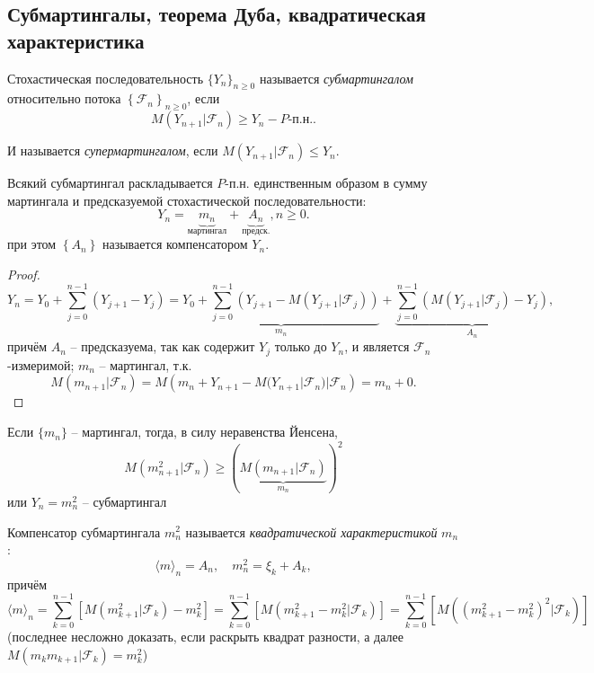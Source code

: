 \subsection{Субмартингалы, теорема Дуба, квадратическая характеристика}

\begin{definition}
  Стохастическая последовательность $\{Y_n\}_{n \geqslant 0}$ называется
  \emph{субмартингалом} относительно потока $ \left\{ \mathcal{F}_n \right\}_{n\geqslant 0} $,
  если
  \[
    M(Y_{n+1} | \mathcal{F}_n) \geqslant Y_n - \text{$P$-п.н.}.
  \]

  И называется \emph{супермартингалом}, если
  $M(Y_{n+1} | \mathcal{F}_n) \leqslant Y_n.$
\end{definition}


\begin{theorem}[Дуб]
  Всякий субмартингал раскладывается $P$-п.н. единственным образом в сумму мартингала
  и предсказуемой стохастической последовательности:
  \[
    Y_n = \underbrace{m_n}_{\text{мартингал}} + \underbrace{A_n}_{\text{предск.}}, n \geqslant 0.
  \]
  при этом $ \left\{ A_n \right\}  $ называется компенсатором $Y_n$.
\end{theorem}
\begin{proof}
  \[
    Y_n = Y_0 + \sum_{j=0}^{n-1} (Y_{j+1} - Y_j)
    = \underbrace{Y_0 + \sum_{j=0}^{n-1} (Y_{j+1} - M(Y_{j+1}|\mathcal{F}_j))}_{m_n}
    + \underbrace{\sum_{j=0}^{n-1} (M(Y_{j+1} | \mathcal{F}_j) - Y_j)}_{A_n},
  \]
  причём $A_n$ -- предсказуема, так как содержит $Y_j$ только до $Y_n$, и является
  $\mathcal{F}_n$-измеримой;
  $m_n$ -- мартингал, т.к.
  \[
    M( m_{n+1} | \mathcal{F}_n ) =
    M\left( m_n + Y_{n+1} - M(Y_{n+1} |\mathcal{F}_n) | \mathcal{F}_n \right) = m_n + 0.
  \]
\end{proof}

\begin{corollary}
  Если $\{m_n\}$ -- мартингал, тогда, в силу неравенства Йенсена,
  \[
    M(m_{n+1}^2 | \mathcal{F}_n) \geqslant \left( \underbrace{M(m_{n+1}|\mathcal{F}_n)}_{m_n} \right)^2
  \]
  или $Y_n = m_n^2$ -- субмартингал
\end{corollary}

\begin{definition}
  Компенсатор субмартингала $m_n^2$ называется \emph{квадратической характеристикой} $m_n$:
  \[
    \langle m \rangle_n = A_n, \quad 
    m_n^2 = \xi_k + A_k,
  \]
  причём
  \[
    \langle m \rangle_n =
    \sum_{k=0}^{n-1} \left[M( m_{k+1}^2 | \mathcal{F}_k) - m_k^2 \right] =
    \sum_{k=0}^{n-1} \left[ M( m_{k+1}^2 - m_k^2 | \mathcal{F}_k ) \right] =
    \sum_{k=0}^{n-1} \left[ M( (m_{k+1}^2 - m_k^2)^2 | \mathcal{F}_k ) \right] 
  \]
  (последнее несложно доказать, если раскрыть квадрат разности, а далее
  $M(m_k m_{k+1} | \mathcal{F}_k) = m_k^2$)
\end{definition}

